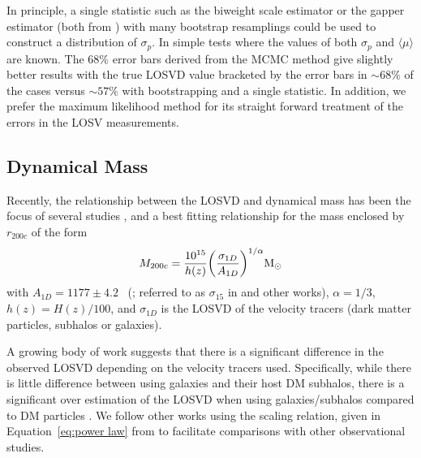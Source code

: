 \documentclass[fleqn,usenatbib]{mnras}
\newcommand{\editorial}[1]{\textcolor{red}{#1}}
\begin{document}
In principle, a single statistic such as the biweight scale estimator or the gapper estimator (both from \citealt{Beers1990}) with many bootstrap resamplings could be used to construct a distribution of $\sigma_p$. In simple tests where the values of both $\sigma_p$ and $\langle\mu\rangle$ are known. The 68\% error bars derived from the MCMC method give slightly better results with the true LOSVD value bracketed by the error bars in $\sim68\%$ of the cases versus $\sim57\%$ with bootstrapping and a single statistic. In addition, we prefer the maximum likelihood method for its straight forward treatment of the errors in the LOSV measurements.

\subsection{Dynamical Mass}\label{sec: mass}
Recently, the relationship between the LOSVD and dynamical mass has been the focus of several studies , and a best fitting relationship for the mass enclosed by $r_{200c}$ of the form
\begin{equation}\label{eq:power law}
	M_{200c} = \frac{10^{15}}{h(z)} \bigg{(}\frac{\sigma_{1D}}{A_{1D}} \bigg{)}^{1/\alpha} \hbox{$\mathrm{M}_\odot$}
\end{equation}
with $A_{1D} = 1177 \pm 4.2$ \kms\ (\citealt{Munari2013}; referred to as $\sigma_{15}$ in \citealt{Evrard2008} and other works), $\alpha = 1/3$, $h(z) = H(z)/100$, and $\sigma_{1D}$ is the LOSVD of the velocity tracers (dark matter particles, subhalos or galaxies). 

A growing body of work suggests that there is a significant difference in the observed LOSVD depending on the velocity tracers used. Specifically, while there is little difference between using galaxies and their host DM subhalos, there is a significant over estimation of the LOSVD when using galaxies/subhalos compared to DM particles \citep{Munari2013}. We follow other works  using the scaling relation, given in Equation~\ref{eq:power law} from \cite{Munari2013} to facilitate comparisons with other observational studies. 
\end{document}
